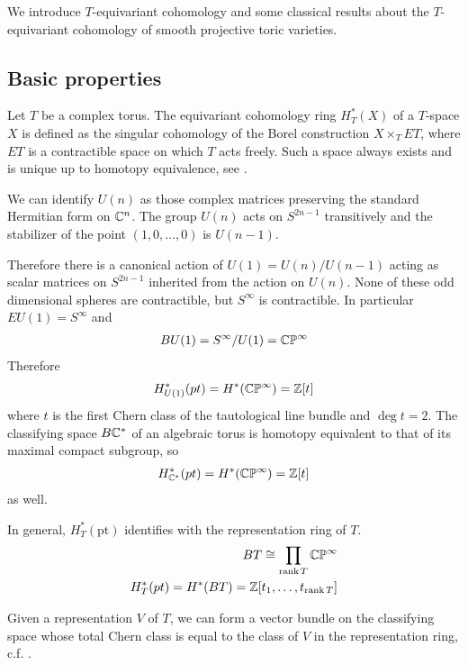 We introduce $T$-equivariant cohomology and some classical results about the
$T$-equivariant cohomology of smooth projective toric varieties.

\subsection{Basic properties}
Let $T$ be a complex torus. The equivariant cohomology ring $H_T^*(X)$ of a $T$-space $X$ is
defined as the singular cohomology of the Borel construction $X\times_T ET$,
where $ET$ is a contractible space on which $T$ acts freely. Such a space
always exists and is unique up to homotopy equivalence, see \cite{hatcher}.

\begin{example}
	We can identify $U(n)$ as those complex matrices preserving
	the standard Hermitian form on $\mathbb{C}^n$. The group $U(n)$ acts on $S^{2n-1}$ transitively and the stabilizer of the point $(1,0,\ldots,0)$ is $U(n-1)$.

	Therefore there is a canonical action of $U(1) = U(n)/U(n-1)$ acting as scalar matrices on $S^{2n-1}$ inherited from the action on $U(n)$. None of these odd dimensional spheres are contractible, but $S^\infty$ is contractible. In particular $EU(1) = S^\infty$ and \begin{align*}
		BU(1) = S^\infty/U(1) = \mathbb{C}\mathbb{P}^\infty
	\end{align*}
	Therefore \begin{align*}
		H^*_{U(1)}(pt) = H^*(\mathbb{C}\mathbb{P}^\infty) = \mathbb{Z}[t]
	\end{align*} where $t$ is the first Chern class of the tautological line bundle and $\deg t = 2$. The classifying space $B\mathbb{C}^*$ of an algebraic torus is
	homotopy equivalent to that of its maximal compact subgroup, so \begin{align*}
		H^*_{\mathbb{C}^*}(pt) = H^*(\mathbb{C}\mathbb{P}^\infty) = \mathbb{Z}[t]
	\end{align*} as well.
\end{example}

\begin{example}
	In general, $H_T^*(\text{pt})$ identifies with the representation ring of $T$. \begin{align*}
		BT \cong \prod_{\operatorname{rank} T} \mathbb{C}\mathbb{P}^\infty \\
		H_T^*(pt) = H^*(BT) = \mathbb{Z}[t_1,\ldots,t_{\operatorname{rank} T}]
	\end{align*}

	Given a representation $V$ of $T$,
	we can form a vector bundle on the classifying space whose
	total Chern class is equal to the class of $V$ in the representation ring, c.f. \cite{huybrechts}.
\end{example}

